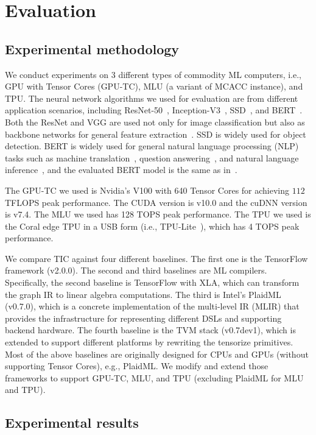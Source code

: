 \section{Evaluation}
\subsection{Experimental methodology}

We conduct experiments on 3 different types of commodity ML computers, i.e., GPU with Tensor Cores (GPU-TC), MLU (a variant of MCACC instance), and TPU. The neural network algorithms we used for evaluation are from different application scenarios, including ResNet-50~\cite{he2016deep}, Inception-V3~\cite{Szegedy16CVPR}, SSD~\cite{liu2016ssd}, and BERT~\cite{Devlin18BERT}. Both the ResNet and VGG are used not only for image classification but also as backbone networks for general feature extraction~\cite{ren2015faster}. SSD is widely used for object detection. BERT is widely used for general natural language processing (NLP) tasks such as machine translation~\cite{wang2019learning}, question answering~\cite{shao2019transformer}, and natural language inference~\cite{cai2019improving}, and the evaluated BERT model is the same as in~\cite{Jia19SOSP}.

The GPU-TC we used is Nvidia's V100 with 640 Tensor Cores for achieving $112$ TFLOPS peak performance. The CUDA version is v10.0 and the cuDNN version is v7.4. The MLU we used has 128 TOPS peak performance. The TPU we used is the Coral edge TPU in a USB form (i.e., TPU-Lite~\cite{tflite}), which has 4 TOPS peak performance.

We compare TIC against four different baselines. The first one is the TensorFlow framework (v2.0.0). The second and third baselines are ML compilers. Specifically, the second baseline is TensorFlow with XLA, which can transform the graph IR to linear algebra computations. The third is Intel's PlaidML~\cite{plaidML} (v0.7.0), which is a concrete implementation of the multi-level IR (MLIR) that provides the infrastructure for representing different DSLs and supporting backend hardware. The fourth baseline is the TVM stack (v0.7dev1), which is extended to support different platforms by rewriting the tensorize primitives. Most of the above baselines are originally designed for CPUs and GPUs (without supporting Tensor Cores), e.g., PlaidML. We modify and extend those frameworks to support GPU-TC, MLU, and TPU (excluding PlaidML for MLU and TPU).


\subsection{Experimental results}

